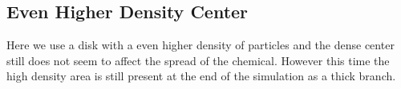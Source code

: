 \begin{minipage}{0.45\textwidth}
\subsection{Even Higher Density Center}
Here we use a disk with a even higher density of particles and the dense center still does not seem to affect the spread of the chemical.
However this time the high density area is still present at the end of the simulation as a thick branch.
\end{minipage}
